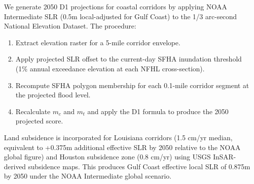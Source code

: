 We generate 2050 D1 projections for coastal corridors by applying NOAA Intermediate SLR
(0.5m local-adjusted for Gulf Coast) to the 1/3 arc-second National Elevation Dataset. The
procedure:

\begin{enumerate}
\item Extract elevation raster for a 5-mile corridor envelope.
\item Apply projected SLR offset to the current-day SFHA inundation threshold (1\% annual
exceedance elevation at each NFHL cross-section).
\item Recompute SFHA polygon membership for each 0.1-mile corridor segment at the projected
flood level.
\item Recalculate $m_c$ and $m_t$ and apply the D1 formula to produce the 2050 projected score.
\end{enumerate}

Land subsidence is incorporated for Louisiana corridors (1.5 cm/yr median, equivalent to
+0.375m additional effective SLR by 2050 relative to the NOAA global figure) and Houston
subsidence zone (0.8 cm/yr) using USGS InSAR-derived subsidence maps. This produces Gulf
Coast effective local SLR of 0.875m by 2050 under the NOAA Intermediate global scenario.
